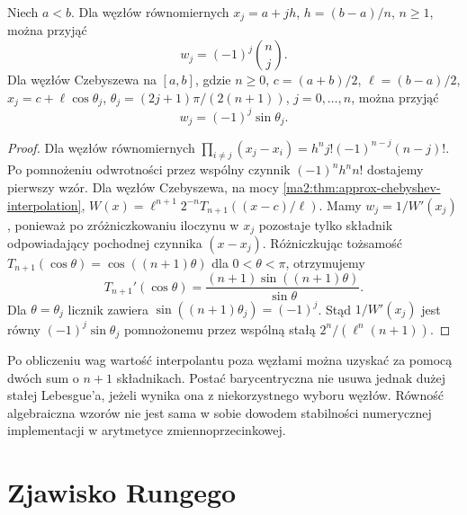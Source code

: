 \begin{wniosek}
\label{ma2:cor:approx-barycentric-weights}
Niech $a<b$. Dla węzłów równomiernych $x_j=a+jh$,
$h=(b-a)/n$, $n\ge1$, można przyjąć
\[
 w_j=(-1)^j\binom nj.
\]
Dla węzłów Czebyszewa na $[a,b]$, gdzie $n\ge0$,
$c=(a+b)/2$, $\ell=(b-a)/2$,
$x_j=c+\ell\cos\theta_j$,
$\theta_j=(2j+1)\pi/(2(n+1))$,
$j=0,\ldots,n$, można przyjąć
\[
 w_j=(-1)^j\sin\theta_j.
\]
\end{wniosek}
\begin{proof}
Dla węzłów równomiernych
$\prod_{i\ne j}(x_j-x_i)=h^n j!(-1)^{n-j}(n-j)!$.
Po pomnożeniu odwrotności przez wspólny
czynnik $(-1)^n h^n n!$ dostajemy pierwszy wzór.
Dla węzłów Czebyszewa, na mocy
\ref{ma2:thm:approx-chebyshev-interpolation},
$W(x)=\ell^{n+1}2^{-n}T_{n+1}((x-c)/\ell)$.
Mamy $w_j=1/W'(x_j)$, ponieważ po
zróżniczkowaniu iloczynu w $x_j$
pozostaje tylko składnik odpowiadający
pochodnej czynnika $(x-x_j)$.
Różniczkując tożsamość
$T_{n+1}(\cos\theta)=\cos((n+1)\theta)$
dla $0<\theta<\pi$, otrzymujemy
\[
 T_{n+1}'(\cos\theta)=
 \frac{(n+1)\sin((n+1)\theta)}{\sin\theta}.
\]
Dla $\theta=\theta_j$ licznik zawiera
$\sin((n+1)\theta_j)=(-1)^j$.
Stąd $1/W'(x_j)$ jest równy
$(-1)^j\sin\theta_j$ pomnożonemu
przez wspólną stałą $2^n/(\ell^n(n+1))$.
\end{proof}

Po obliczeniu wag wartość interpolantu poza
węzłami można uzyskać za pomocą dwóch sum
o $n+1$ składnikach. Postać barycentryczna
nie usuwa jednak dużej stałej Lebesgue'a,
jeżeli wynika ona z niekorzystnego wyboru
węzłów. Równość algebraiczna wzorów nie jest
sama w sobie dowodem stabilności numerycznej
implementacji w arytmetyce zmiennoprzecinkowej.

\section{Zjawisko Rungego}


